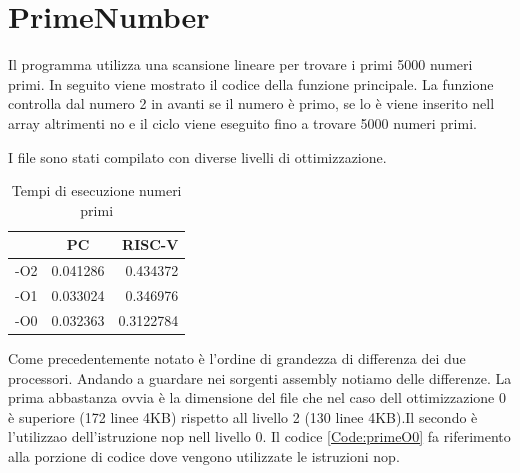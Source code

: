 \documentclass[12pt,a4paper]{report}
\begin{document}
\section{PrimeNumber}
Il programma utilizza una scansione lineare per trovare i primi 5000 numeri primi. In seguito viene mostrato il codice della funzione principale.  La funzione controlla dal numero 2 in avanti se il numero è primo, se lo è viene inserito nell array altrimenti no e il ciclo viene eseguito fino a trovare 5000 numeri primi.  



I file sono stati compilato con diverse livelli di ottimizzazione.
\begin{table}[h]
\begin{tabular}{|l|c|r|}
\hline
    & PC       & RISC-V    \\ \hline
-O2 & 0.041286 & 0.434372  \\ \hline
-O1 & 0.033024 & 0.346976  \\ \hline
-O0 & 0.032363 & 0.3122784 \\ \hline
\end{tabular}
\caption{Tempi di esecuzione numeri primi}
\label{Tab:TempoPrime}
\end{table}
Come precedentemente notato è l'ordine di grandezza di differenza dei due processori. Andando a guardare nei sorgenti assembly notiamo delle differenze. La prima abbastanza ovvia è la dimensione del file che nel caso dell ottimizzazione 0 è superiore (172 linee 4KB) rispetto all livello 2 (130 linee 4KB).Il secondo è l'utilizzao dell'istruzione nop nell livello 0.
Il codice \ref{Code:primeO0} fa riferimento alla porzione di codice dove vengono utilizzate le istruzioni nop.\\


\end{document}

